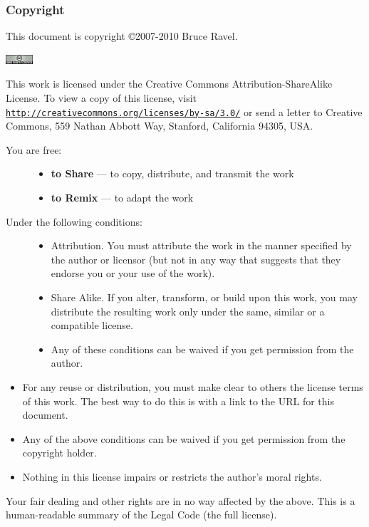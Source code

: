 
\begin{frame}
  \frametitle{Copyright}
  \tiny

  This document is copyright \copyright 2007-2010 Bruce Ravel.

  \begin{center}
    \includegraphics[width=1.0cm]{images/somerights20}
  \end{center}

  This work is licensed under the Creative Commons
  Attribution-ShareAlike License.  To view a copy of this license,
  visit \href{http://creativecommons.org/licenses/by-sa/3.0/}
  {\color{Purple4}\texttt{http://creativecommons.org/licenses/by-sa/3.0/}}
  or send a letter to Creative Commons, 559 Nathan Abbott Way,
  Stanford, California 94305, USA.

  \begin{description}
  \item[You are free:] %
    \begin{itemize}
    \item \textbf{to Share} --- to copy, distribute, and transmit the work
    \item \textbf{to Remix} --- to adapt the work
    \end{itemize}
  \item[Under the following conditions:] %
    \begin{itemize}
    \item Attribution. You must attribute the work in the manner
      specified by the author or licensor (but not in any way that
      suggests that they endorse you or your use of the work).
    \item Share Alike. If you alter, transform, or build upon this
      work, you may distribute the resulting work only under the same,
      similar or a compatible license.
    \item Any of these conditions can be waived if you get permission
      from the author.
    \end{itemize}
  \end{description}
  \begin{itemize}
  \item For any reuse or distribution, you must make clear to others
    the license terms of this work. The best way to do this is with a
    link to the URL for this document.
  \item Any of the above conditions can be waived if you get
    permission from the copyright holder.
  \item Nothing in this license impairs or restricts the author's
    moral rights.
  \end{itemize}

  Your fair dealing and other rights are in no way affected by the
  above.  This is a human-readable summary of the Legal Code (the full
  license).


\end{frame}

